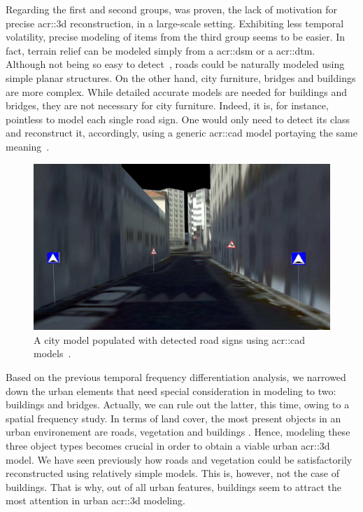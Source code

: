             Regarding the first and second groups, was proven, the lack of motivation for precise \gls{acr::3d} reconstruction, in a large-scale setting.
            Exhibiting less temporal volatility, precise modeling of items from the third group seems to be easier.
            In fact, terrain relief can be modeled simply from a \gls{acr::dsm} or a \gls{acr::dtm}.
            Although not being so easy to detect~\parencite{mnih2010learning}, roads could be naturally modeled using simple planar structures.
            On the other hand, city furniture, bridges and buildings are more complex.
            While detailed accurate models are needed for buildings and bridges, they are not necessary for city furniture.
            Indeed, it is, for instance, pointless to model each single road sign.
            One would only need to detect its class and reconstruct it, accordingly, using a generic \gls{acr::cad} model portaying the same meaning~\parencite{soheilian2013detection}.\\
            \begin{figure}[htpb]
                \centering
                \includegraphics[width=\textwidth]{images/introduction/modeling_road_signs}
                \caption{
                    \label{fig::3d_road_signs_models} A city model populated with detected road signs using \gls{acr::cad} models~\parencite{soheilian2013detection}.
                }
            \end{figure}

            Based on the previous temporal frequency differentiation analysis, we narrowed down the urban elements that need special consideration in modeling to two: buildings and bridges. 
            Actually, we can rule out the latter, this time, owing to a spatial frequency study.
            In terms of land cover, the most present objects in an urban environement are roads, vegetation and buildings \addref.
            Hence, modeling these three object types becomes crucial in order to obtain a viable urban \gls{acr::3d} model.
            We have seen previously how roads and vegetation could be satisfactorily reconstructed using relatively simple models.
            This is, however, not the case of buildings.
            That is why, out of all urban features, buildings seem to attract the most attention in urban \gls{acr::3d} modeling.

